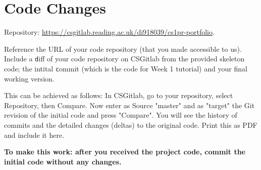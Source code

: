 \section{Code Changes}
Repository: \url{https://csgitlab.reading.ac.uk/di918039/cs1pr-portfolio}.

Reference the URL of your code repository (that you made accessible to us).
Include a {\texttt diff} of your code repository on CSGitlab from the provided skeleton code; the intital {\texttt commit} (which is the code for Week 1 tutorial) and your final working version.

This can be achieved as follows:
In CSGitlab, go to your repository, select Repository, then Compare.
Now enter as Source "master" and as "target" the Git revision of the initial code and press "Compare".
You will see the history of commits and the detailed changes (deltas) to the original code.
Print this as PDF and include it here.

\textbf{To make this work: after you received the project code, commit the initial code without any changes.}


